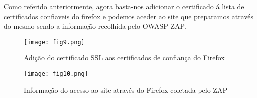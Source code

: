 Como referido anteriormente, agora basta-nos adicionar o certificado á lista de certificados confiaveis do firefox e podemos aceder ao site que preparamos através do mesmo sendo a informação recolhida pelo OWASP ZAP.

\begin{figure}[H]

  \centering

  \texttt{[image: fig9.png]}

  \caption{Adição do certificado SSL aos certificados de confiança do Firefox}

\end{figure}
\begin{figure}[H]

  \centering

  \texttt{[image: fig10.png]}

  \caption{Informação do acesso ao site através do Firefox coletada pelo ZAP}

\end{figure}

